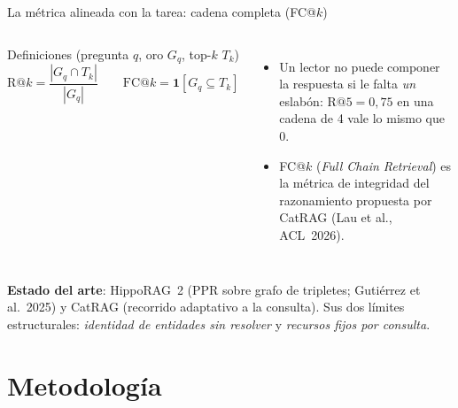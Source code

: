 \documentclass[aspectratio=169,10pt]{beamer}
\newcommand{\hippo}{HippoRAG~2}
\newcommand{\mal}[1]{\textcolor{teja}{\textbf{#1}}}
\begin{document}
\begin{frame}{La métrica alineada con la tarea: cadena completa (FC@$k$)}
\begin{columns}[T]
\begin{block}{Definiciones (pregunta $q$, oro $G_q$, top-$k$ $T_k$)}
\[
\mathrm{R@}k=\frac{|G_q\cap T_k|}{|G_q|}
\qquad
\mathrm{FC@}k=\mathbf{1}\!\left[G_q\subseteq T_k\right]
\]
\end{block}
\begin{itemize}
\item Un lector no puede componer la respuesta si le falta \emph{un} eslabón:
  $\mathrm{R@}5=0{,}75$ en una cadena de 4 vale lo mismo que 0.
\item FC@$k$ (\emph{Full Chain Retrieval}) es la métrica de integridad del
  razonamiento propuesta por CatRAG (Lau et al., ACL~2026).
\end{itemize}
\centering
{}
\end{columns}
\vspace{2mm}
\textbf{Estado del arte}: \hippo{} (PPR sobre grafo de tripletes; Gutiérrez et al.\ 2025)
y CatRAG (recorrido adaptativo a la consulta). Sus dos límites estructurales:
\emph{identidad de entidades sin resolver} y \emph{recursos fijos por consulta}.
\end{frame}

\section{Metodología}
\end{document}
